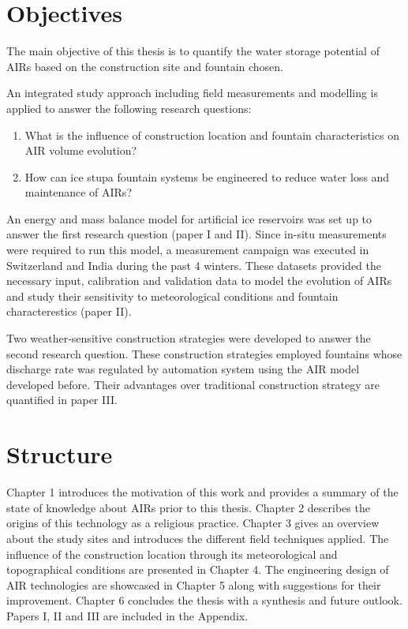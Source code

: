\section{Objectives}

The main objective of this thesis is to quantify the water storage potential of AIRs based on the construction
site and fountain chosen. 

An integrated study approach including field measurements and modelling is applied to answer the following
research questions: 

\begin{enumerate}

\item What is the influence of construction location and fountain characteristics on AIR volume evolution? 

\item How can ice stupa fountain systems be engineered to reduce water loss and maintenance of AIRs?

\end{enumerate}

An energy and mass balance model for artificial ice reservoirs was set up to answer the first research question
(paper I and II). Since in-situ measurements were required to run this model, a measurement campaign was
executed in Switzerland and India during the past 4 winters. These datasets provided the necessary input,
calibration and validation data to model the evolution of AIRs and study their sensitivity to meteorological
conditions and fountain characterestics (paper II). 

Two weather-sensitive construction strategies were developed to answer the second research question. These
construction strategies employed fountains whose discharge rate was regulated by automation system using the AIR
model developed before. Their advantages over traditional construction strategy are quantified in paper III.

\section{Structure}

Chapter 1 introduces the motivation of this work and provides a summary of the state of knowledge about AIRs
prior to this thesis. Chapter 2 describes the origins of this technology as a religious practice. Chapter 3
gives an overview about the study sites and introduces the different field techniques applied. The influence of
the construction location through its meteorological and topographical conditions are presented in Chapter 4.
The engineering design of AIR technologies are showcased in Chapter 5 along with suggestions for their
improvement. Chapter 6 concludes the thesis with a synthesis and future outlook. Papers I, II and III are
included in the Appendix.


